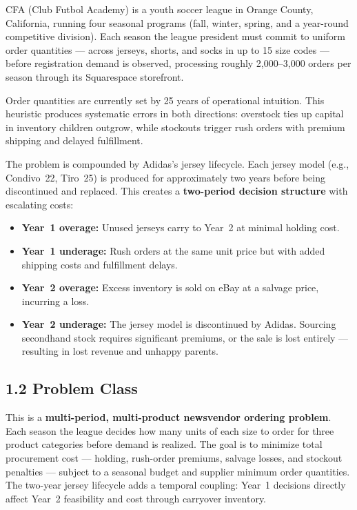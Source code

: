 \documentclass[11pt]{article}
\begin{document}
CFA (Club Futbol Academy) is a youth soccer league in Orange County, California, running four seasonal
programs (fall, winter, spring, and a year-round competitive division). Each season the league president
must commit to uniform order quantities --- across jerseys, shorts, and socks in up to 15 size codes ---
before registration demand is observed, processing roughly 2{,}000--3{,}000 orders per season through its
Squarespace storefront.

Order quantities are currently set by 25 years of operational intuition. This heuristic produces systematic
errors in both directions: overstock ties up capital in inventory children outgrow, while stockouts trigger
rush orders with premium shipping and delayed fulfillment. 

The problem is compounded by Adidas's jersey lifecycle. Each jersey model (e.g., Condivo~22, Tiro~25)
is produced for approximately two years before being discontinued and replaced. This creates a
\textbf{two-period decision structure} with escalating costs:

\begin{itemize}[leftmargin=2em, itemsep=1pt]
  \item \textbf{Year~1 overage:} Unused jerseys carry to Year~2 at minimal holding cost.
  \item \textbf{Year~1 underage:} Rush orders at the same unit price but with added shipping costs and fulfillment delays.
  \item \textbf{Year~2 overage:} Excess inventory is sold on eBay at a salvage price, incurring a loss.
  \item \textbf{Year~2 underage:} The jersey model is discontinued by Adidas. Sourcing secondhand stock requires significant premiums, or the sale is lost entirely --- resulting in lost revenue and unhappy parents.
\end{itemize}

\subsection*{1.2 \; Problem Class}

This is a \textbf{multi-period, multi-product newsvendor ordering problem}. Each season the league
decides how many units of each size to order for three product categories before demand is realized.
The goal is to minimize total procurement cost --- holding, rush-order premiums, salvage losses, and
stockout penalties --- subject to a seasonal budget and supplier minimum order quantities. The
two-year jersey lifecycle adds a temporal coupling: Year~1 decisions directly affect Year~2 feasibility
and cost through carryover inventory.
\end{document}
